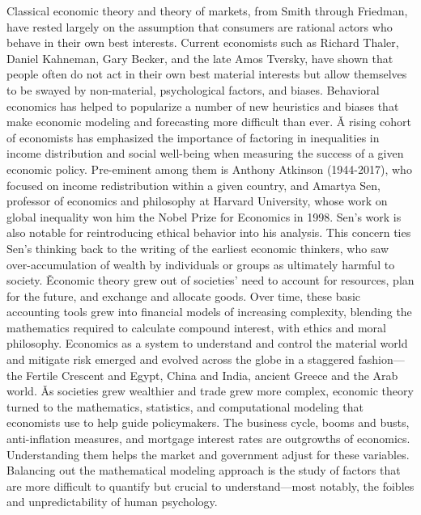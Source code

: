 Classical economic theory and theory of markets, from Smith through Friedman, have rested largely on the assumption
that consumers are rational actors who behave in their own best interests. Current economists such as Richard Thaler,
Daniel Kahneman, Gary Becker, and the late Amos Tversky, have shown that people often do not act in their own best
material interests but allow themselves to be swayed by non-material, psychological factors, and biases. Behavioral
economics has helped to popularize a number of new heuristics and biases that make economic modeling and forecasting
more difficult than ever. \v

A rising cohort of economists has emphasized the importance of factoring in inequalities in income distribution and
social well-being when measuring the success of a given economic policy. Pre-eminent among them is Anthony Atkinson
(1944-2017), who focused on income redistribution within a given country, and Amartya Sen, professor of economics and
philosophy at Harvard University, whose work on global inequality won him the Nobel Prize for Economics in 1998.
Sen's work is also notable for reintroducing ethical behavior into his analysis. This concern ties Sen's thinking
back to the writing of the earliest economic thinkers, who saw over-accumulation of wealth by individuals or groups
as ultimately harmful to society. \v

Economic theory grew out of societies' need to account for resources, plan for the future, and exchange and allocate
goods. Over time, these basic accounting tools grew into financial models of increasing complexity, blending the
mathematics required to calculate compound interest, with ethics and moral philosophy. Economics as a system to
understand and control the material world and mitigate risk emerged and evolved across the globe in a staggered
fashion—the Fertile Crescent and Egypt, China and India, ancient Greece and the Arab world. \v

As societies grew wealthier and trade grew more complex, economic theory turned to the mathematics, statistics, and
computational modeling that economists use to help guide policymakers. The business cycle, booms and busts,
anti-inflation measures, and mortgage interest rates are outgrowths of economics. Understanding them helps the market
and government adjust for these variables. Balancing out the mathematical modeling approach is the study of factors
that are more difficult to quantify but crucial to understand—most notably, the foibles and unpredictability of human
psychology.


